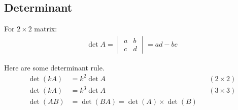 \documentclass[../main.tex]{subfiles}
\begin{document}
\subsection*{Determinant} For $2\times 2$ matrix:
\begin{align*}
	\det A=\begin{vmatrix}
		       a & b \\
		       c & d
	       \end{vmatrix}=ad-bc
\end{align*}

Here are some determinant rule.
\begin{align*}
	\det(kA) & =k^2\det A                      &  & (2\times2) \\
	\det(kA) & =k^3\det A                      &  & (3\times3) \\
	\det(AB) & =\det(BA)=\det(A)\times\det (B)
\end{align*}
\end{document}
